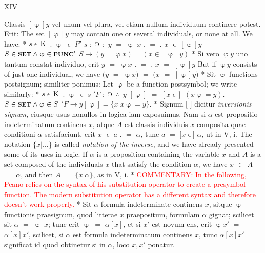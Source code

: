 \documentclass{book}
\newcommand{\s}{\switchcolumn} %
\newcommand{\C}{\mathop{\sbox0{$\displaystyle$$\reflectbox{C}$} %
\raisebox{-\height+\ht0-0.05cm}[\ht0][\dp0]{\scalebox{0.8}[0.8]{\copy0}}}\displaylimits} %
\newcommand{\pppNoSpace}{\leavevmode\lower0ex\hbox{.}\kern-0.1em\raise0.7ex\hbox{.}\kern-0.1em\lower0ex\hbox{.}} %
\newcommand{\smallIn}{\ensuremath{\mathrel{\epsilon}}}
\newcommand{\K}{\mathop{\thinspace \text{K} \thinspace}}
\newcommand{\setOfSets}{\mathord{\text{{\footnotesize \textbf{SET}}}}}
\newcommand{\func}{\mathord{\text{{\footnotesize \textbf{FUNC}}}}}
\newcommand\commentary[1]{\textcolor{red}{COMMENTARY: #1}}
\newcommand{\peanoPage}[1]{\vspace{1ex}

  \columnratio{0.475, 0.05, 0.475} \begin{paracol}{3} \centering \hdashrule{\columnwidth}{0.1mm}{0.1mm 1mm} \s #1 \s \hdashrule{\columnwidth}{0.1mm}{0.1mm 1mm} \end{paracol}

\vspace{1ex}}
\newenvironment{translateTwoCol}
               { %
                 \columnratio{0.5, 0.5} \begin{paracol}{2}
                 \newcommand{\LAT}{\switchcolumn[0]*}
                 \newcommand{\ENG}{\switchcolumn[1]}
               }
               { %
                 \let\ENG\undefined
                 \let\LAT\undefined
                 \end{paracol}
               }
\begin{document}
\peanoPage{XIV} %

\begin{translateTwoCol}
Classis $[\upvarphi] y$ vel unum vel plura, vel etiam nullum individuum continere potest. Erit:
\ENG
The set $[\upvarphi] y$ may contain one or several individuals, or none at all. We have:
\LAT
\hspace{1.06cm} $s \smallIn \K$ $.$ $\upvarphi$ $\smallIn$ $F'$ $s$ $:$ $\C$ $:$ $y$ $=$ $\upvarphi$ $x$ $.$ $=$ $.$ $x$ $\smallIn$ $[\upvarphi] y$
\ENG
\hspace{1.06cm} $S \in \setOfSets \wedge \upvarphi \in \func'$ $S \rightarrow (y = \upvarphi x)=(x \in [\upvarphi] y)$
\LAT
Si vero $\upvarphi y$ uno tantum constat individuo, erit $y$ $=$ $\upvarphi x$ $.$ $=$ $.$ $x$ $=$ $[\upvarphi] y$
\ENG
But if $\upvarphi y$ consists of just one individual, we have $(y$ $=$ $\upvarphi x)$ $=$ $(x$ $=$ $[\upvarphi] y)$
\LAT
Sit $\upvarphi$ functions postsignum; similiter ponimus:
\ENG
Let $\upvarphi$ be a function postsymbol; we write similarly:
\LAT
\hspace{1.06cm} $s \smallIn \K$ $.$ $\upvarphi$ $\smallIn$ $s$ $'F$ $:$ $\C$ $\pppNoSpace$ $y$ $[ \upvarphi ]$ $=$ $[ x\smallIn ]$ $(x \upvarphi = y)$.  %
\ENG
\hspace{1.06cm} $S \in \setOfSets \wedge \upvarphi \in S$ $'F \rightarrow y [ \upvarphi ] = \{ x | x \upvarphi = y\}$.
\LAT
Signum $[$ $]$ dicitur \emph{inversionis signum}, eiusque usus nonullos in logica iam exposuimus. Nam si $\alpha$ est propositio indeterminatum continens $x$, atque $A$ est classis individuis $x$ composita quae conditioni $\alpha$ satisfaciunt, erit $x$ $\smallIn$ $a$ $.$ $=$ $\alpha$, tunc $a$ $=$ $[x$\smallIn$]$ $\alpha$, ut in V, i.
\ENG
The notation $\{ x | \ldots \}$ is called \emph{notation of the inverse}, and we have already presented some of its uses in logic. If $\alpha$ is a proposition containing the variable $x$ and $A$ is a set composed of the individuals $x$ that satisfy the condition $\alpha$, we have $x$ $\in$ $A$ $=$ $\alpha$, and then $A$ $=$ $\{ x | \alpha \}$, as in V, i. %
\LAT
\ENG
\commentary{In the following, Peano relies on the syntax of his substitution operator to create a presymbol function.  The modern substitution operator has a different syntax and therefore doesn't work properly.}
\LAT
Sit $\alpha$ formula indeterminate continens $x$, sitque $\upvarphi$ functionis praesignum, quod litterae $x$ praepositum, formulam $\alpha$ gignat; scilicet sit $\alpha$ $=$ $\upvarphi$ $x$; tunc erit $\upvarphi$ $=$ $\alpha [x]$, et si $x'$ est novum ens, erit $\upvarphi x'$ $=$ $\alpha [x] x'$, scilicet, si $\alpha$ est formula indeterminatum continens $x$, tunc $\alpha [x] x'$ significat id quod obtinetur si in $\alpha$, loco $x, x'$ ponatur.

\end{translateTwoCol}
\end{document}
